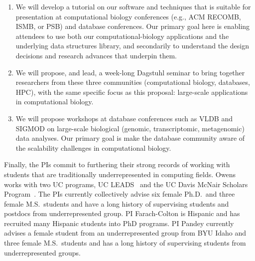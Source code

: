 \begin{enumerate}%
  \item We will develop a tutorial on our software and techniques that is suitable for presentation at computational biology conferences (e.g., ACM RECOMB, ISMB, or PSB) and database conferences. Our primary goal here is enabling attendees to use both our computational-biology applications and the underlying data structures library, and secondarily to understand the design decisions and research advances that underpin them.
  \item We will propose, and lead, a week-long Dagstuhl seminar to bring together researchers from these three communities (computational biology, databases, HPC), with the same specific focus as this proposal: large-scale applications in computational biology.
  \item We will propose workshops at database conferences such as VLDB and SIGMOD on large-scale biological (genomic, transcriptomic, metagenomic) data analyses. Our primary goal is make the database community aware of the scalability challenges in computational biology. 
\end{enumerate}

Finally, the PIs commit to furthering their strong records of working with students that are traditionally underrepresented in computing fields. Owens works with two UC programs, UC LEADS~\cite{UCLeads:2003:WEB} and the UC Davis McNair Scholars Program~\cite{McNair:2003:WEB}.  The PIs currently collectively advise six female Ph.D.\ and three female M.S.\ students and have a long history of supervising students and postdocs from underrepresented group.
PI Farach-Colton is Hispanic and has recruited many Hispanic students into PhD programs. PI Pandey currently advises a female student from an underrepresented group from BYU Idaho and three female M.S.\ students and has a long history of supervising students from underrepresented groups.  
